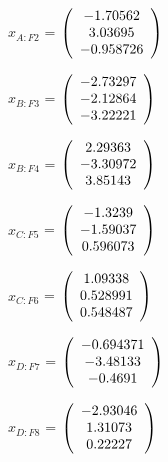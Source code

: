 \begin{description}
$x_{A:F2}$ = $\left( \begin{array} {ccc}   -1.70562 \\    3.03695 \\  -0.958726 
\end{array} \right)\\ \\$

$x_{B:F3}$ = $\left( \begin{array} {ccc}   -2.73297 \\   -2.12864 \\   -3.22221 
\end{array} \right)\\ \\$

$x_{B:F4}$ = $\left( \begin{array} {ccc}    2.29363 \\   -3.30972 \\    3.85143 
\end{array} \right)\\ \\$

$x_{C:F5}$ = $\left( \begin{array} {ccc}    -1.3239 \\   -1.59037 \\   0.596073 
\end{array} \right)\\ \\$

$x_{C:F6}$ = $\left( \begin{array} {ccc}    1.09338 \\   0.528991 \\   0.548487 
\end{array} \right)\\ \\$

$x_{D:F7}$ = $\left( \begin{array} {ccc}  -0.694371 \\   -3.48133 \\    -0.4691 
\end{array} \right)\\ \\$

$x_{D:F8}$ = $\left( \begin{array} {ccc}   -2.93046 \\    1.31073 \\    0.22227 
\end{array} \right)\\ \\$


\end{description}
